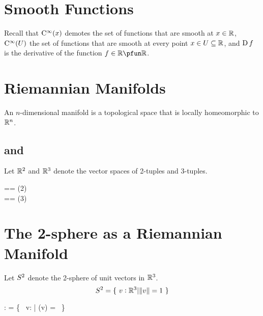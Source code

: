 \documentclass[11pt, oneside]{article}
\begin{document}
\begin{example}


\end{example}

\section{Smooth Functions}

Recall that $\operatorname{C^{\infty}}(x)$ demotes the set of functions that are smooth at $x \in \mathbb{R}$, $\operatorname{C^{\infty}}(U)$ the set of functions that are smooth at
every point $x \in U \subseteq \mathbb{R}$, and $\operatorname{D} f$ is the derivative of the function $f \in \R \pfun \R$.

\section{Riemannian Manifolds}

An $n$-dimensional manifold is a topological space that is locally homeomorphic to $\mathbb{R}^n$.

\subsection{ and }

Let $\mathbb{R}^2$ and $\mathbb{R}^3$ denote the vector spaces of 2-tuples and 3-tuples.
\begin{zed}
	\Rtwo == \Rtuples(2) \\
	\Rthree == \Rtuples(3)
\end{zed}


\section{The 2-sphere as a Riemannian Manifold}

Let $S^2$ denote the 2-sphere of unit vectors in $\mathbb{R}^3$.
\begin{equation}
	S^2 = \{~ v: \mathbb{R}^3 | \norm{v} = 1 ~\}
\end{equation}

\begin{axdef}
	\Stwo: \power \Rthree
\where
	\Stwo = \{~ v: \Rthree | \normR(v) = \oneR ~\}
\end{axdef}
\end{document}
